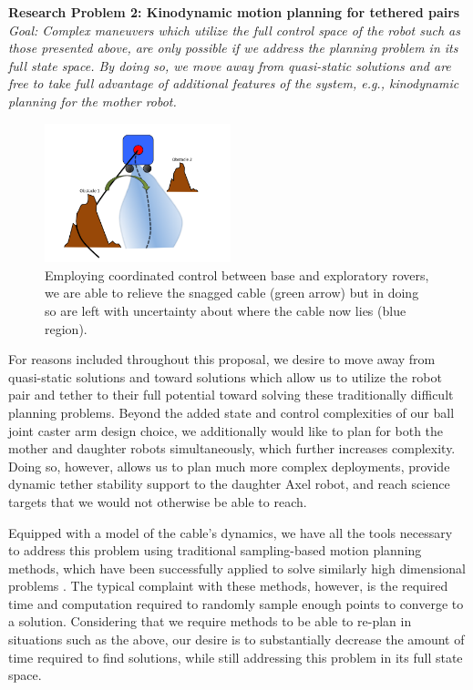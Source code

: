 \documentclass[12pt]{article}
\begin{document}
{\bf Research Problem 2: Kinodynamic motion planning for tethered pairs \\}
{\sl Goal: Complex maneuvers which utilize the full control space of the robot such as those presented above, 
are only possible if we address the planning problem in its full state space. By doing so, we move away from quasi-static 
solutions and are free to take full advantage of additional features of the system, e.g., kinodynamic planning for the mother
robot. }
\begin{figure}
  \begin{center}
	\vspace{-0.5in}	
	\includegraphics[width=0.48\textwidth, left]{cable_uncertainty}
  \end{center}
  \vspace{-0.5in}
  \label{fig:cable}
  \caption{Employing coordinated control between base and exploratory rovers, we are able to relieve the snagged cable (green arrow) but in doing so are left with uncertainty about where the cable now lies (blue region).}
\end{figure}
\vspace{-0.15in}

For reasons included throughout this proposal, we desire to move away from quasi-static solutions and 
toward solutions which allow us to utilize the robot pair and tether to their full potential toward solving 
these traditionally difficult planning problems. Beyond the added state and control complexities of our 
ball joint caster arm design choice, we additionally would like to plan for both the mother and daughter 
robots simultaneously, which further increases complexity. Doing so, however, allows us to plan much more complex deployments, 
provide dynamic tether stability support to the daughter Axel robot, and reach science targets that we would not otherwise 
be able to reach.

Equipped with a model of the cable's dynamics, we have all the tools necessary to address this problem 
using traditional sampling-based motion planning methods, which have been successfully applied to solve similarly 
high dimensional problems \cite{zak_kino}. The typical complaint with these methods, however, is the required time and 
computation required to randomly sample enough points to converge to a solution. Considering that we require 
methods to be able to re-plan in situations such as the above, our desire is to substantially decrease the amount of time 
required to find solutions, while still addressing this problem in its full state space. 
\end{document}
